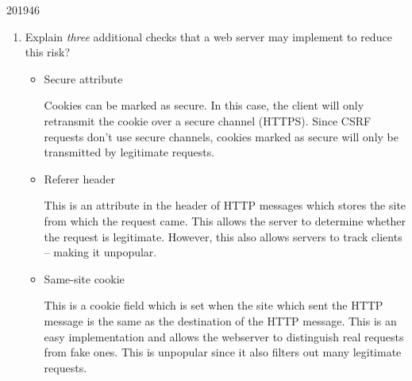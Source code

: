 \documentclass[10pt,\jkfside,a4paper]{article}
\begin{document}
\begin{examquestion}{2019}{4}{6}
\begin{enumerate}[label=(\alph*)]
\begin{enumerate}[label=(\roman*)]
\item Explain \textit{three} additional checks that a web server may implement
to reduce this risk?

\begin{itemize}

\item Secure attribute

Cookies can be marked as secure. In this case, the client will only
retransmit the cookie over a secure channel (HTTPS). Since CSRF requests
don't use secure channels, cookies marked as secure will only be transmitted
by legitimate requests.

\item Referer header

This is an attribute in the header of HTTP messages which stores the site
from which the request came. This allows the server to determine whether the
request is legitimate. However, this also allows servers to track clients --
making it unpopular.

\item Same-site cookie

This is a cookie field which is set when the site which sent the HTTP
message is the same as the destination of the HTTP message. This is an easy
implementation and allows the webserver to distinguish real requests from
fake ones. This is unpopular since it also filters out many legitimate
requests.

\end{itemize}

\end{enumerate}

\end{enumerate}

\end{examquestion}
\end{document}
